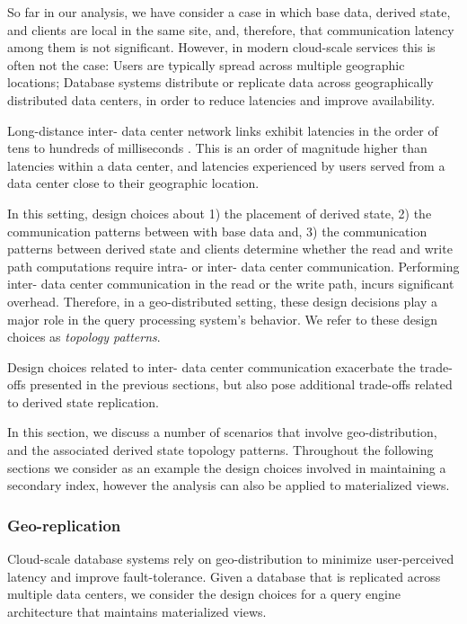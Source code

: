 
So far in our analysis,
we have consider a case in which base data, derived state, and clients are local in the same site,
and, therefore, that communication latency among them is not significant.
However, in modern cloud-scale services this is often not the case:
Users are typically spread across multiple geographic locations;
Database systems distribute or replicate data across geographically distributed data centers,
in order to reduce latencies and improve availability.

Long-distance inter- data center network links exhibit latencies in the order of tens to hundreds of milliseconds \cite{pbailis:hats}.
This is an order of magnitude higher than latencies within a data center,
and latencies experienced by users served from a data center close to their geographic location.

In this setting, design choices about 1) the placement of derived state,
2) the communication patterns between with base data and, 3) the communication patterns between derived state and clients
determine whether the read and write path computations require intra- or inter- data center communication.
Performing inter- data center communication in the read or the write path,
incurs significant overhead.
Therefore, in a geo-distributed setting,
these design decisions play a major role in the query processing system's behavior.
We refer to these design choices as \textit{topology patterns}.

Design choices related to inter- data center communication exacerbate the trade-offs presented in the previous sections,
but also pose additional trade-offs related to derived state replication.

In this section, we discuss a number of scenarios that involve geo-distribution, and the associated derived state
topology patterns.
Throughout the following sections we consider as an example the design choices involved in maintaining a secondary index,
however the analysis can also be applied to materialized views.

\subsubsection{Geo-replication}
Cloud-scale database systems rely on geo-distribution to minimize user-perceived latency and improve fault-tolerance.
Given a database that is replicated across multiple data centers, we consider the design choices for a
query engine architecture that maintains materialized views.

